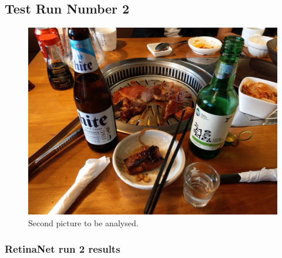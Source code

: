     \newpage

    \subsection{Test Run Number 2}

    \begin{figure}[htb]
        \centering
        \includegraphics[scale = 0.20]{Sections/4InitialWork/4_images_obj_run2/photo.jpg}
        \caption{Second picture to be analysed.} 
    \end{figure}

    \subsubsection{RetinaNet run 2 results}

